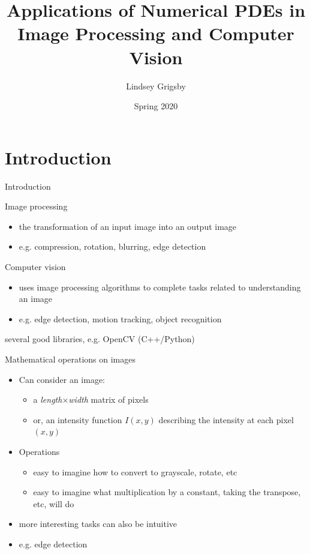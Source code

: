 \documentclass{beamer}
\title{Applications of Numerical PDEs in Image Processing and Computer Vision}
\author{Lindsey Grigsby}
\institute{University of Florida}
\date{Spring 2020}
\begin{document}
\begin{frame}
  \titlepage
\end{frame}


\section{Introduction}

\begin{frame}{Introduction}

    \begin{block}{Image processing}
    \begin{itemize}
        \item the transformation of an input image into an output image
        \item e.g. compression, rotation, blurring, edge detection
    \end{itemize}
    \end{block}
    
    \begin{block}{Computer vision}
    \begin{itemize}
      \item uses image processing algorithms to complete tasks related to understanding an image
      \item e.g. edge detection, motion tracking, object recognition
    \end{itemize}
    \end{block}
    
    several good libraries, e.g. OpenCV (C++/Python)

\end{frame}

\begin{frame}{Mathematical operations on images}
    
    \begin{itemize}
        \item Can consider an image:
        \begin{itemize}
            \item a \textit{length}$\times$\textit{width} matrix of pixels
            \item or, an intensity function $I(x,y)$ describing the intensity at each pixel $(x,y)$
        \end{itemize}
        \item Operations
        \begin{itemize}
            \item easy to imagine how to convert to grayscale, rotate, etc
            \item easy to imagine what multiplication by a constant, taking the transpose, etc, will do
        \end{itemize}
        \item more interesting tasks can also be intuitive
        \item e.g. edge detection 
    \end{itemize}

\end{frame}
\end{document}
